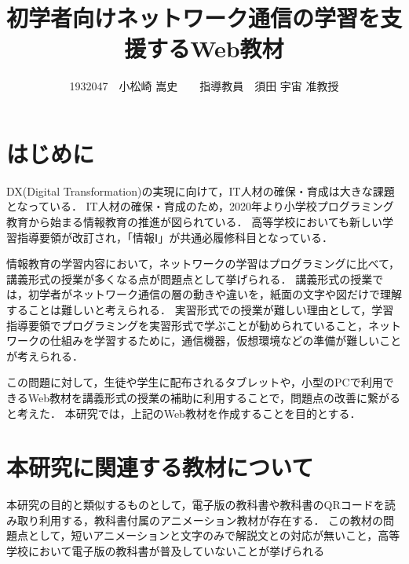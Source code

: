 \documentclass[twocolumn,10pt,a4j]{ltjsarticle}
\title{初学者向けネットワーク通信の学習を支援するWeb教材}
\author{1932047　小松崎 嵩史　　指導教員　須田 宇宙 准教授}
\date{}
\begin{document}
\maketitle

\section{はじめに}

DX(Digital Transformation)の実現に向けて，IT人材の確保・育成は大きな課題となっている\cite{dx}．
IT人材の確保・育成のため，2020年より小学校プログラミング教育から始まる情報教育の推進が図られている．
高等学校においても新しい学習指導要領が改訂され，「情報Ⅰ」が共通必履修科目となっている．


情報教育の学習内容において，ネットワークの学習はプログラミングに比べて，講義形式の授業が多くなる点が問題点として挙げられる．
講義形式の授業では，初学者がネットワーク通信の層の動きや違いを，紙面の文字や図だけで理解することは難しいと考えられる．
実習形式での授業が難しい理由として，学習指導要領でプログラミングを実習形式で学ぶことが勧められていること\cite{koukou_sidou}，ネットワークの仕組みを学習するために，通信機器，仮想環境などの準備が難しいことが考えられる．

この問題に対して，生徒や学生に配布されるタブレットや，小型のPCで利用できるWeb教材を講義形式の授業の補助に利用することで，問題点の改善に繋がると考えた．
本研究では，上記のWeb教材を作成することを目的とする．

\section{本研究に関連する教材について}
本研究の目的と類似するものとして，電子版の教科書や教科書のQRコードを読み取り利用する，教科書付属のアニメーション教材が存在する．
この教材の問題点として，短いアニメーションと文字のみで解説文との対応が無いこと，高等学校において電子版の教科書が普及していないことが挙げられる
\end{document}

